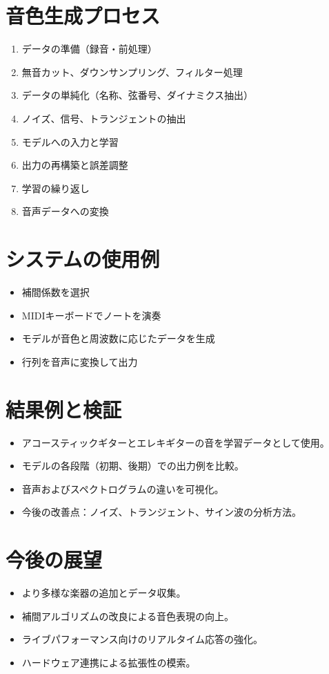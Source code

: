 \documentclass[a4paper, 12pt]{article}
\begin{document}
\section{音色生成プロセス}

\begin{enumerate}
  \item データの準備（録音・前処理）\cite{DDSP_Piano}
  \item 無音カット、ダウンサンプリング、フィルター処理
  \item データの単純化（名称、弦番号、ダイナミクス抽出）
  \item ノイズ、信号、トランジェント\cite{sitrano}の抽出
  \item モデルへの入力と学習
  \item 出力の再構築と誤差調整
  \item 学習の繰り返し
  \item 音声データへの変換
\end{enumerate}

\section{システムの使用例}
\begin{itemize}
  \item 補間係数を選択
  \item MIDIキーボードでノートを演奏
  \item モデルが音色と周波数に応じたデータを生成
  \item 行列を音声に変換して出力
\end{itemize}

\section{結果例と検証}

\begin{itemize}
  \item アコースティックギターとエレキギターの音を学習データとして使用。
  \item モデルの各段階（初期、後期）での出力例を比較。
  \item 音声およびスペクトログラムの違いを可視化。
  \item 今後の改善点：ノイズ、トランジェント、サイン波の分析方法。
\end{itemize}

\section{今後の展望}
\begin{itemize}
  \item より多様な楽器の追加とデータ収集。
  \item 補間アルゴリズムの改良による音色表現の向上。
  \item ライブパフォーマンス向けのリアルタイム応答の強化。
  \item ハードウェア連携による拡張性の模索。
\end{itemize}



\end{document}
